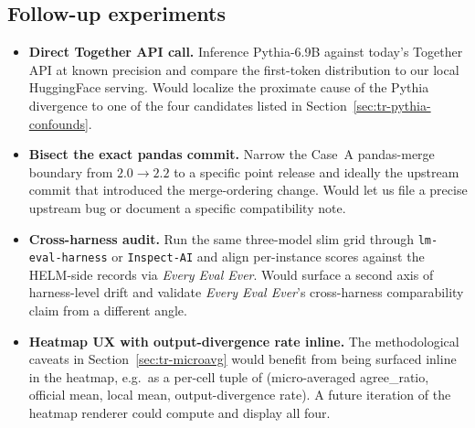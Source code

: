 \documentclass[11pt]{article}
\newcommand{\eee}{\textit{Every Eval Ever}\xspace}
\begin{document}
\subsection{Follow-up experiments}
\label{sec:tr-followups}

\begin{itemize}
  \item \textbf{Direct Together API call.}
        Inference Pythia-6.9B against today's Together API at known
        precision and compare the first-token distribution to our
        local HuggingFace serving.
        Would localize the proximate cause of the Pythia divergence
        to one of the four candidates listed in
        Section~\ref{sec:tr-pythia-confounds}.
  \item \textbf{Bisect the exact pandas commit.}
        Narrow the Case~A pandas-merge boundary from
        $2.0 \to 2.2$ to a specific point release and ideally the
        upstream commit that introduced the merge-ordering change.
        Would let us file a precise upstream bug or document a
        specific compatibility note.
  \item \textbf{Cross-harness audit.}
        Run the same three-model slim grid through
        \texttt{lm-eval-harness} or \texttt{Inspect-AI} and align
        per-instance scores against the HELM-side records via
        \eee{}.
        Would surface a second axis of harness-level drift and
        validate \eee{}'s cross-harness comparability claim from a
        different angle.
  \item \textbf{Heatmap UX with output-divergence rate inline.}
        The methodological caveats in
        Section~\ref{sec:tr-microavg} would benefit from being
        surfaced inline in the heatmap, e.g.\ as a per-cell tuple of
        (micro-averaged agree\_ratio, official mean, local mean,
        output-divergence rate).
        A future iteration of the heatmap renderer could compute
        and display all four.
\end{itemize}
\end{document}
